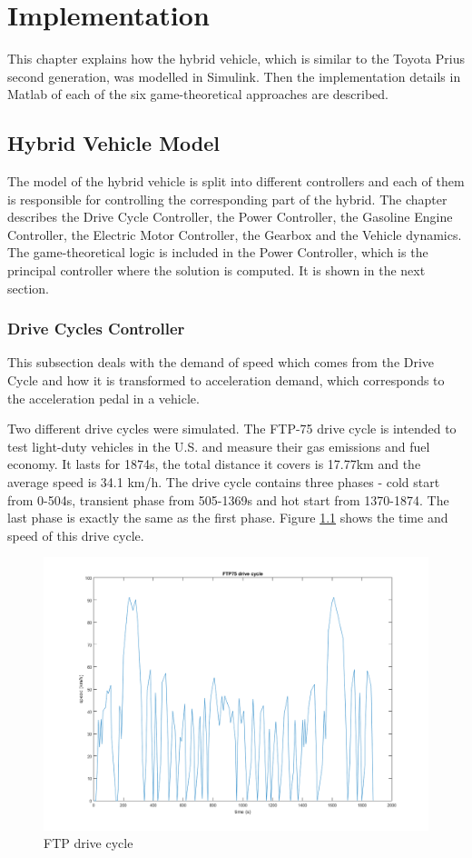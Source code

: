 \chapter{Implementation}
\label{chp:implementation}
This chapter explains how the hybrid vehicle, which is similar to the Toyota Prius second generation, was modelled in Simulink. Then the implementation details in Matlab of each of the six game-theoretical approaches are described.

\section{Hybrid Vehicle Model}
The model of the hybrid vehicle is split into different controllers and each of them is responsible for controlling the corresponding part of the hybrid. The chapter describes the Drive Cycle Controller, the Power Controller, the Gasoline Engine Controller, the Electric Motor Controller, the Gearbox and the Vehicle dynamics. The game-theoretical logic is included in the Power Controller, which is the principal controller where the solution is computed. It is shown in the next section.

\subsection{Drive Cycles Controller}
This subsection deals with the demand of speed which comes from the Drive Cycle and how it is transformed to acceleration demand, which corresponds to the acceleration pedal in a vehicle.

Two different drive cycles were simulated. The FTP-75 drive cycle is intended to test light-duty vehicles in the U.S. and measure their gas emissions and fuel economy. It lasts for 1874s, the total distance it covers is 17.77km and the average speed is 34.1 km/h. The drive cycle contains three phases - cold start from 0-504s, transient phase from 505-1369s and hot start from 1370-1874. The last phase is exactly the same as the first phase. Figure \ref{fig:ftp75} shows the time and speed of this drive 
cycle.

\begin{figure}[h]
\centering
\includegraphics[scale=0.45]{figures/FTP75}
\caption{FTP drive cycle}
\label{fig:ftp75}
\end{figure}

